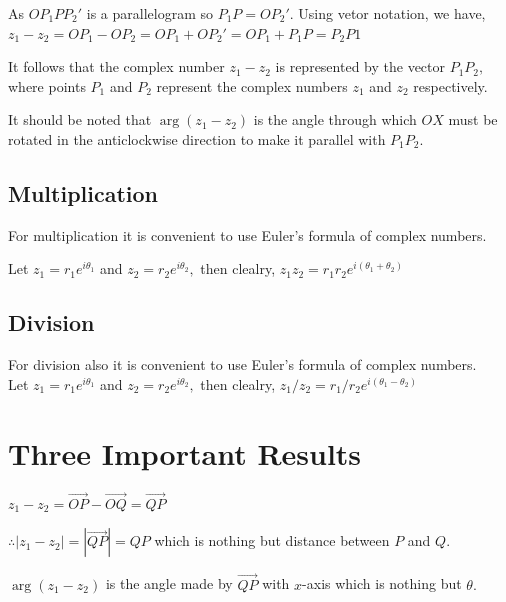 As $OP_1PP_2'$ is a parallelogram so $P_1P = OP_2'.$ Using vetor notation, we have, $z_1 - z_2 = OP_1 - OP_2 = OP_1 + OP_2' = OP_1 + P_1P = P_2P1$

It follows that the complex number $z_1 - z_2$ is represented by the vector $P_1P_2,$ where points $P_1$ and $P_2$ represent the
complex numbers $z_1$ and $z_2$ respectively.

It should be noted that $\arg(z_1 - z_2)$ is the angle through which $OX$ must be rotated in the anticlockwise direction to make it
parallel with $P_1P_2.$

\subsection{Multiplication}
\startplacefigure[title={Complex numbers subtraction}]
\stopplacefigure
For multiplication it is convenient to use Euler's formula of complex numbers.

Let $z_1 = r_1e^{i\theta_1}$ and $z_2 = r_2e^{i\theta_2},$ then clealry, $z_1z_2 = r_1r_2e^{i(\theta_1 + \theta_2)}$

\subsection{Division}
\startplacefigure[title={Complex numbers division}]
\stopplacefigure
For division also it is convenient to use Euler's formula of complex numbers.\\

Let $z_1 = r_1e^{i\theta_1}$ and $z_2 = r_2e^{i\theta_2},$ then clealry, $z_1/z_2 = r_1/r_2e^{i(\theta_1 - \theta_2)}$

\section{Three Important Results}
\startplacefigure[title={External angle}]
\stopplacefigure

$z_1 - z_2 = \overrightarrow{OP} - \overrightarrow{OQ} = \overrightarrow{QP}$

$\therefore |z_1 - z_2| = |\overrightarrow{QP}| = QP$ which is nothing but distance between $P$ and $Q.$

$\arg(z_1 - z_2)$ is the angle made by $\overrightarrow{QP}$ with $x$-axis which is nothing but $\theta.$

\startplacefigure[title={Angle relation between three complex numbers}, reference=fig:arbtcn]
\stopplacefigure

